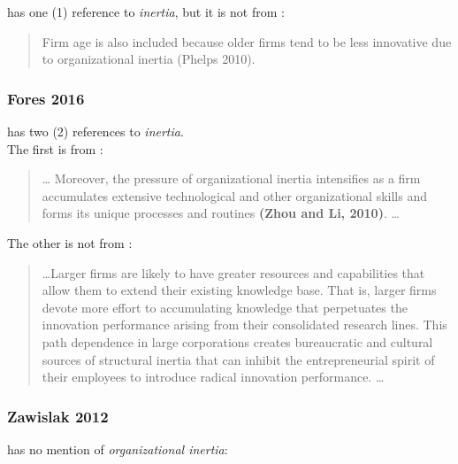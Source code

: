 \cite{cui2016utilizing} has one (1) reference to \textit{inertia}, but it is not from \cite{zhou2010technological}: \\
\begin{quotation}
Firm age is also included because older firms tend to be
less innovative due to organizational inertia (Phelps 2010).
\end{quotation}

\subsubsection{Fores 2016}

\cite{fores2016does} has two (2) references to \textit{inertia}.\\

The first is from \cite{zhou2010technological}:\\
\begin{quotation}
\ldots 
Moreover, the pressure of organizational inertia intensifies as a firm accumulates
extensive technological and other organizational skills and forms its unique processes and
routines \textbf{(Zhou and Li, 2010)}. \ldots
\end{quotation}

The other is not from \cite{zhou2010technological}:\\
\begin{quotation}
\ldots Larger firms are likely to have greater resources and capabilities that allow them
to extend their existing knowledge base. That is, larger firms devote more effort to
accumulating knowledge that perpetuates the innovation performance arising from their
consolidated research lines. This path dependence in large corporations creates bureaucratic
and cultural sources of structural inertia that can inhibit the entrepreneurial spirit of their
employees to introduce radical innovation performance. \ldots
\end{quotation}

\subsubsection{Zawislak 2012}

\cite{zawislak2012innovation} has no mention of \textit{organizational inertia}:

